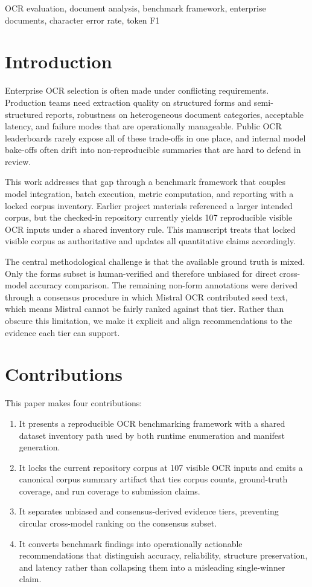 \documentclass[conference]{IEEEtran}
\begin{document}
\begin{IEEEkeywords}
OCR evaluation, document analysis, benchmark framework, enterprise documents, character error rate, token F1
\end{IEEEkeywords}

\section{Introduction}

Enterprise OCR selection is often made under conflicting requirements. Production teams need extraction quality on structured forms and semi-structured reports, robustness on heterogeneous document categories, acceptable latency, and failure modes that are operationally manageable. Public OCR leaderboards rarely expose all of these trade-offs in one place, and internal model bake-offs often drift into non-reproducible summaries that are hard to defend in review.

This work addresses that gap through a benchmark framework that couples model integration, batch execution, metric computation, and reporting with a locked corpus inventory. Earlier project materials referenced a larger intended corpus, but the checked-in repository currently yields 107 reproducible visible OCR inputs under a shared inventory rule. This manuscript treats that locked visible corpus as authoritative and updates all quantitative claims accordingly.

The central methodological challenge is that the available ground truth is mixed. Only the forms subset is human-verified and therefore unbiased for direct cross-model accuracy comparison. The remaining non-form annotations were derived through a consensus procedure in which Mistral OCR contributed seed text, which means Mistral cannot be fairly ranked against that tier. Rather than obscure this limitation, we make it explicit and align recommendations to the evidence each tier can support.

\section{Contributions}

This paper makes four contributions:
\begin{enumerate}
    \item It presents a reproducible OCR benchmarking framework with a shared dataset inventory path used by both runtime enumeration and manifest generation.
    \item It locks the current repository corpus at 107 visible OCR inputs and emits a canonical corpus summary artifact that ties corpus counts, ground-truth coverage, and run coverage to submission claims.
    \item It separates unbiased and consensus-derived evidence tiers, preventing circular cross-model ranking on the consensus subset.
    \item It converts benchmark findings into operationally actionable recommendations that distinguish accuracy, reliability, structure preservation, and latency rather than collapsing them into a misleading single-winner claim.
\end{enumerate}
\end{document}
